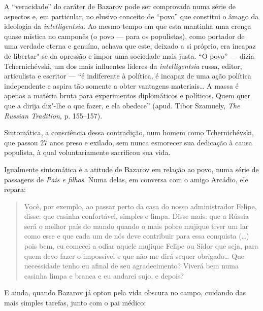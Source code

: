 A ``veracidade'' do caráter de Bazarov pode ser comprovada numa série de
aspectos e, em particular, no elusivo conceito de ``povo'' que constitui
o âmago da ideologia da \emph{intelligentsia}. Ao mesmo tempo em que esta
mantinha uma crença quase mística no camponês (o povo --- para os
populistas), como portador de uma verdade eterna e genuína, achava que
este, deixado a si próprio, era incapaz de libertar"-se da opressão e
impor uma sociedade mais justa. ``O povo'' --- dizia Tchernichévski, um dos
mais influentes líderes da \emph{intelligentsia} russa, editor,
articulista e escritor --- ``é indiferente à política, é incapaz de uma
ação política independente e aspira tão somente a obter vantagens
materiais\ldots{} A massa é apenas a matéria bruta para experimentos diplomáticos e
políticos. Quem quer que a dirija diz"-lhe o que fazer, e ela obedece'' (apud. Tibor Szamuely, \emph{The Russian Tradition}, p. 155--157).

Sintomática, a consciência dessa contradição, num homem como
Tchernichévski, que passou 27 anos preso e exilado, sem nunca esmorecer
sua dedicação à causa populista, à qual voluntariamente sacrificou sua
vida.

Igualmente sintomática é a atitude de Bazarov em relação ao povo, numa
série de passagens de \emph{Pais e filhos}. Numa delas, em conversa com o amigo Arcádio, ele
repara:

\begin{quote}
Você, por exemplo, ao passar perto da casa do nosso administrador
Felipe, disse: que casinha confortável, simples e limpa. Disse mais: que
a Rússia será o melhor país do mundo quando o mais pobre mujique tiver
um lar como esse e que cada um de nós deve contribuir para essa
conquista (\ldots{}) pois bem, eu comecei a odiar aquele mujique Felipe ou
Sídor que seja, para quem devo fazer o impossível e que não me dirá
sequer obrigado\ldots{} Que necessidade tenho eu afinal de seu
agradecimento? Viverá bem numa casinha limpa e branca e eu andarei sujo,
e depois?
\end{quote}

E ainda, quando Bazarov já optou pela vida obscura no campo, cuidando
das mais simples tarefas, junto com o pai médico:

